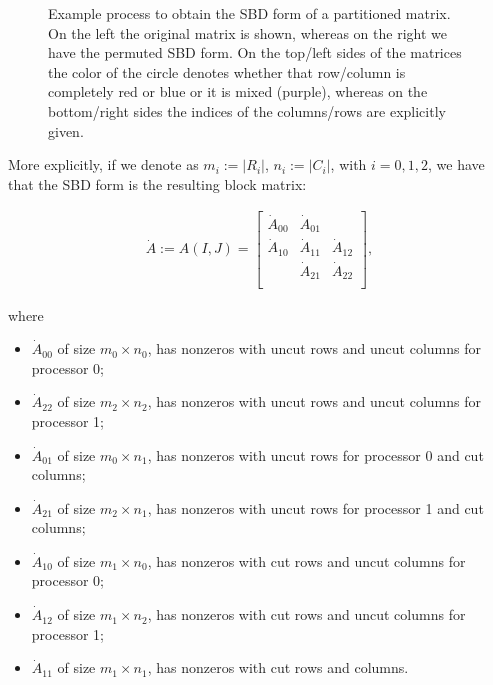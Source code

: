 \begin{figure}[h]
	\caption{Example process to obtain the SBD form of a partitioned matrix. On the left the original matrix is shown, whereas on the right we have the permuted SBD form. On the top/left sides of the matrices the color of the circle denotes whether that row/column is completely red or blue or it is mixed (purple), whereas on the bottom/right sides the indices of the columns/rows are explicitly given.} \label{fig:sbd}
\end{figure}

More explicitly, if we denote as $m_i := |R_i|$, $n_i := |C_i|$, with $i=0,1,2$, we have that the SBD form is the resulting block matrix:

\begin{align}\dot{A} := A(I,J) = 
	\begin{bmatrix}
		\dot{A}_{00} & \dot{A}_{01}  & \\
		\dot{A}_{10} & \dot{A}_{11} & \dot{A}_{12} \\
		& \dot{A}_{21} & \dot{A}_{22} \\ 
	\end{bmatrix}, \label{eq:sbd}
\end{align}

where

\begin{itemize}
	\item $\dot{A}_{00}$ of size $m_0 \times n_0$, has nonzeros with uncut rows and uncut columns for processor 0;
	\item $\dot{A}_{22}$ of size $m_2 \times n_2$, has nonzeros with uncut rows and uncut columns for processor 1;
	\item $\dot{A}_{01}$ of size $m_0 \times n_1$, has nonzeros with uncut rows for processor 0 and cut columns;
	\item $\dot{A}_{21}$ of size $m_2 \times n_1$, has nonzeros with uncut rows for processor 1 and cut columns;
	\item $\dot{A}_{10}$ of size $m_1 \times n_0$, has nonzeros with cut rows and uncut columns for processor 0;
	\item $\dot{A}_{12}$ of size $m_1 \times n_2$, has nonzeros with cut rows and uncut columns for processor 1;
	\item $\dot{A}_{11}$ of size $m_1 \times n_1$, has nonzeros with cut rows and columns.
\end{itemize}

